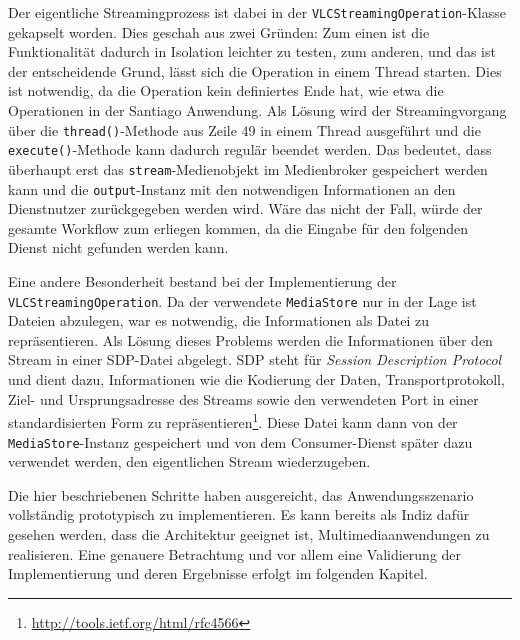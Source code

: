   Der eigentliche Streamingprozess ist dabei in der \verb!VLCStreamingOperation!-Klasse gekapselt worden. Dies geschah aus zwei Gründen: Zum einen ist die Funktionalität dadurch in Isolation leichter zu testen, zum anderen, und das ist der entscheidende Grund, lässt sich die Operation in einem Thread starten. Dies ist notwendig, da die Operation kein definiertes Ende hat, wie etwa die Operationen in der Santiago Anwendung. Als Lösung wird der Streamingvorgang über die \verb!thread()!-Methode aus Zeile 49 in einem Thread ausgeführt und die \verb!execute()!-Methode kann dadurch regulär beendet werden. Das bedeutet, dass überhaupt erst das \verb!stream!-Medienobjekt im Medienbroker gespeichert werden kann und die \verb!output!-Instanz mit den notwendigen Informationen an den Dienstnutzer zurückgegeben werden wird. Wäre das nicht der Fall, würde der gesamte Workflow zum erliegen kommen, da die Eingabe für den folgenden Dienst nicht gefunden werden kann.
  
  Eine andere Besonderheit bestand bei der Implementierung der \verb!VLCStreamingOperation!. Da der verwendete \verb!MediaStore! nur in der Lage ist Dateien abzulegen, war es notwendig, die Informationen als Datei zu repräsentieren. Als Lösung dieses Problems werden die Informationen über den Stream in einer SDP-Datei abgelegt. SDP steht für \emph{Session Description Protocol} und dient dazu, Informationen wie die Kodierung der Daten, Transportprotokoll, Ziel- und Ursprungsadresse des Streams sowie den verwendeten Port in einer standardisierten Form zu repräsentieren\footnote{\url{http://tools.ietf.org/html/rfc4566}}. Diese Datei kann dann von der \verb!MediaStore!-Instanz gespeichert und von dem Consumer-Dienst später dazu verwendet werden, den eigentlichen Stream wiederzugeben.

  Die hier beschriebenen Schritte haben ausgereicht, das Anwendungsszenario vollständig prototypisch zu implementieren. Es kann bereits als Indiz dafür gesehen werden, dass die Architektur geeignet ist, Multimediaanwendungen zu realisieren. Eine genauere Betrachtung und vor allem eine Validierung der Implementierung und deren Ergebnisse erfolgt im folgenden Kapitel.


